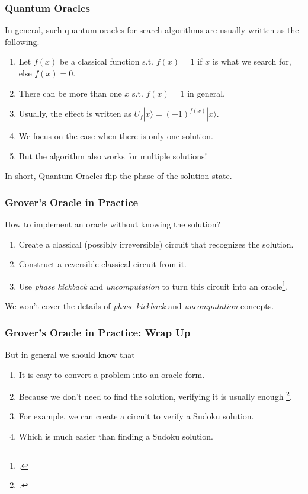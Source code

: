 \documentclass{beamer}
\begin{document}
\begin{frame}
  \frametitle{Quantum Oracles}
  In general, such quantum oracles for search algorithms are usually written as the following.
  \begin{enumerate}
    \item Let $f(x)$ be a classical function s.t. $f(x)=1$ if $x$ is what we search for, else $f(x)=0$.
    \item There can be more than one $x$ s.t. $f(x)=1$ in general.
    \item Usually, the effect is written as $U_f|x\rangle = (-1)^{f(x)}|x\rangle$.
    \item We focus on the case when there is only one solution.
    \item But the algorithm also works for multiple solutions!  
  \end{enumerate}
  In short, Quantum Oracles flip the phase of the solution state.
\end{frame}

\begin{frame}
  \frametitle{Grover's Oracle in Practice}
  How to implement an oracle without knowing the solution?
  \begin{enumerate}
    \item Create a classical (possibly irreversible) circuit that recognizes the solution.
    \item Construct a reversible classical circuit from it.
    \item Use \textit{phase kickback} and \textit{uncomputation} to turn this circuit into an oracle\footcite[]{book}.
  \end{enumerate}
  We won't cover the details of \textit{phase kickback} and \textit{uncomputation} concepts. 

\end{frame}

\begin{frame}
  \frametitle{Grover's Oracle in Practice: Wrap Up}

But in general we should know that 
\begin{enumerate}[.]
  \item It is easy to convert a problem into an oracle form.
  \item Because we don't need to find the solution, verifying it is usually enough \footcite[]{Qiskit}.
  \item For example, we can create a circuit to verify a Sudoku solution.
  \item Which is much easier than finding a Sudoku solution.
\end{enumerate}
\end{frame}
\end{document}
